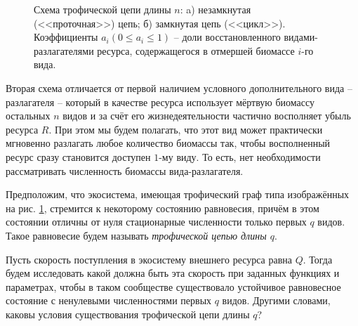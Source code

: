 \begin{figure}[H]
\caption{Схема трофической цепи длины \(n\): a) незамкнутая (<<проточная>>) цепь; б) замкнутая цепь (<<цикл>>). Коэффициенты \(a_i (0 \leq a_i \leq 1)\) -- доли восстановленного видами-разлагателями ресурса, содержащегося в отмершей биомассе \(i\)-го вида.} \label{shemas}
\end{figure}

Вторая схема отличается от первой наличием условного дополнительного вида -- разлагателя -- который в качестве ресурса использует мёртвую биомассу остальных \(n\) видов и за счёт его жизнедеятельности частично восполняет убыль ресурса \(R\). При этом мы будем полагать, что этот вид может практически мгновенно разлагать любое количество биомассы так, чтобы восполненный ресурс сразу становится доступен \(1\)-му виду. То есть, нет необходимости рассматривать численность биомассы вида-разлагателя.

Предположим, что экосистема, имеющая трофический граф типа изображённых на рис. \ref{shemas}, стремится к некоторому состоянию равновесия, причём в этом состоянии отличны от нуля стационарные численности только первых \(q\) видов. Такое равновесие будем называть \textit{трофической цепью длины \(q\)}. 

Пусть скорость поступления в экосистему внешнего ресурса равна \(Q\). Тогда будем исследовать какой должна быть эта скорость при заданных функциях и параметрах, чтобы в таком сообществе существовало устойчивое равновесное состояние с ненулевыми численностями первых \(q\) видов. Другими словами, каковы условия существования трофической цепи длины \(q\)?

